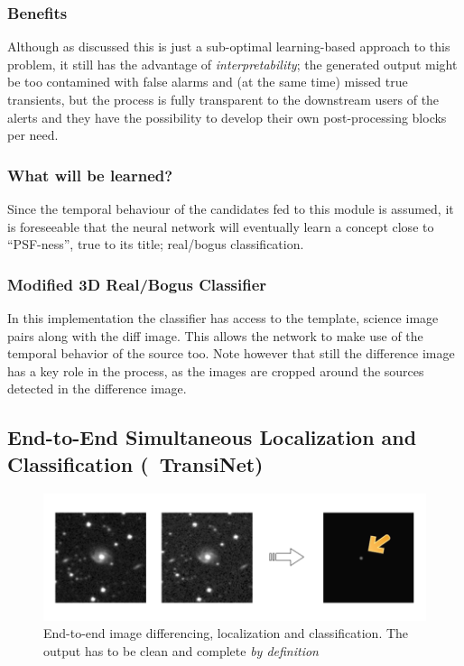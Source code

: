 \subsubsection{Benefits}
\label{sec:rb_benefits}

Although as discussed this is just a sub-optimal learning-based approach to this problem, it still has the advantage of \emph{interpretability}; the generated output might be too contamined with false alarms and (at the same time) missed true transients, but the process is fully transparent to the downstream users of the alerts and they have the possibility to develop their own post-processing blocks per need.


\subsubsection{What will be learned?}
Since the temporal behaviour of the candidates fed to this module is assumed, it is foreseeable that the neural network will eventually learn a concept close to ``PSF-ness'', true to its title; real/bogus classification.

\subsubsection{Modified 3D Real/Bogus Classifier}
In this implementation the classifier has access to the template, science image pairs along with the diff image. This allows the network to make use of the temporal behavior of the source too.
Note however that still the difference image has a key role in the process, as the images are cropped around the sources detected in the difference image.

\subsection{End-to-End Simultaneous Localization and Classification (~TransiNet)}

\begin{figure}[h]
  \centering
  \includegraphics[width=.8\textwidth]{material/transinet-teaser}
  \caption{End-to-end image differencing, localization and classification. The output has to be clean and complete \emph{by definition} }
  \label{fig:transinet-teaser}
\end{figure}

